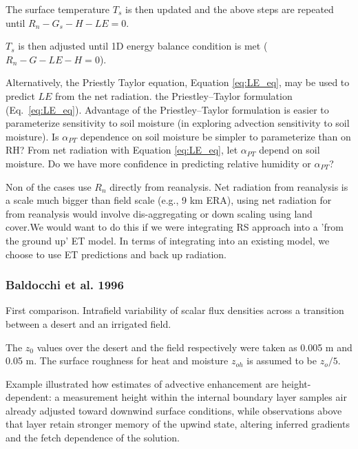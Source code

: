 \documentclass{article}
\begin{document}
    The surface temperature $T_s$ is then updated and the above steps are  repeated until $R_n - G_s - H - LE = 0$.

    $T_s$ is then adjusted until 1D energy balance condition is met ($R_n - G - LE - H = 0$). 

    Alternatively, the Priestly Taylor equation,  Equation \ref{eq:LE_eq}, may be used to predict $LE$ from the net radiation. 
    the Priestley--Taylor formulation (Eq.~\ref{eq:LE_eq}).
    Advantage of the  Priestley--Taylor formulation is easier to parameterize sensitivity to soil moisture (in exploring advection sensitivity to soil moisture). 
    Is $\alpha_{PT}$ dependence on soil moisture  be simpler to parameterize than on RH? 
    From net radiation with Equation \ref{eq:LE_eq}, let $\alpha_{PT}$ depend on soil moisture.  Do we have more confidence in predicting relative humidity or $\alpha_{PT}$? 

    
    Non of the cases use $R_n$ directly from reanalysis. 
    Net radiation from reanalysis is a scale much bigger than field scale (e.g., 9 km ERA), using net radiation for from reanalysis would involve dis-aggregating or down scaling using land cover.We would want to do this if we were integrating RS approach into a 'from the ground up' ET model. In terms of integrating into an existing model, we choose to use ET predictions and back up radiation.


    \subsubsection*{Baldocchi et al. 1996}

    
    First comparison. 
    Intrafield variability of scalar flux densities across a transition between a desert and an irrigated field. 

    The $z_0$ values over the desert and the field respectively were taken as 0.005 m and 0.05 m. 
    The surface roughness for heat and moisture $z_{oh}$ is assumed to be $z_o/5$.

    Example illustrated how estimates of advective enhancement are height-dependent: a measurement height within the internal boundary layer samples air already adjusted toward downwind surface conditions, while observations above that layer retain stronger memory of the upwind state, altering inferred gradients and the fetch dependence of the solution.
\end{document}
